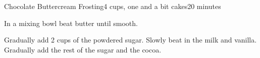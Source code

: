 \documentclass[../Cookbook.tex]{subfiles}
\begin{document}
\begin{recipe}[buttercream]{Chocolate Buttercream Frosting}{4 cups, one and a bit cakes}{20 minutes}

	In a mixing bowl beat butter until smooth.

	Gradually add 2 cups of the powdered sugar. Slowly beat in the milk and vanilla. Gradually add the rest of the sugar and the cocoa.
\end{recipe}
\end{document}

